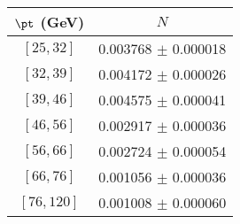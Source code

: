 \begin{tabular}{c||c}
$\pt$ (GeV) & $N$  \\
\hline
$[25, 32]$ & 0.003768 $\pm$ 0.000018\\
$[32, 39]$ & 0.004172 $\pm$ 0.000026\\
$[39, 46]$ & 0.004575 $\pm$ 0.000041\\
$[46, 56]$ & 0.002917 $\pm$ 0.000036\\
$[56, 66]$ & 0.002724 $\pm$ 0.000054\\
$[66, 76]$ & 0.001056 $\pm$ 0.000036\\
$[76, 120]$ & 0.001008 $\pm$ 0.000060\\
\end{tabular}
